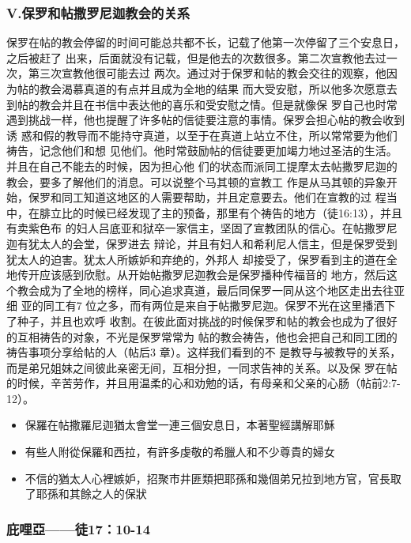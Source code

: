 \subsubsection{V.保罗和帖撒罗尼迦教会的关系}
保罗在帖的教会停留的时间可能总共都不长，记载了他第一次停留了三个安息日，之后被赶了
出来，后面就没有记载，但是他去的次数很多。第二次宣教他去过一次，第三次宣教他很可能去过
两次。通过对于保罗和帖的教会交往的观察，他因为帖的教会渴慕真道的有点并且成为全地的结果
而大受安慰，所以他多次愿意去到帖的教会并且在书信中表达他的喜乐和受安慰之情。但是就像保
罗自己也时常遇到挑战一样，他也提醒了许多帖的信徒要注意的事情。保罗会担心帖的教会收到诱
惑和假的教导而不能持守真道，以至于在真道上站立不住，所以常常要为他们祷告，记念他们和想
见他们。他时常鼓励帖的信徒要更加竭力地过圣洁的生活。并且在自己不能去的时候，因为担心他
们的状态而派同工提摩太去帖撒罗尼迦的教会，要多了解他们的消息。可以说整个马其顿的宣教工
作是从马其顿的异象开始，保罗和同工知道这地区的人需要帮助，并且定意要去。他们在宣教的过
程当中，在腓立比的时候已经发现了主的预备，那里有个祷告的地方（徒16:13），并且有卖紫色布
的妇人吕底亚和狱卒一家信主，坚固了宣教团队的信心。在帖撒罗尼迦有犹太人的会堂，保罗进去
辩论，并且有妇人和希利尼人信主，但是保罗受到犹太人的迫害。犹太人所嫉妒和弃绝的，外邦人
却接受了，保罗看到主的道在全地传开应该感到欣慰。从开始帖撒罗尼迦教会是保罗播种传福音的
地方，然后这个教会成为了全地的榜样，同心追求真道，最后同保罗一同从这个地区走出去往亚细
亚的同工有7 位之多，而有两位是来自于帖撒罗尼迦。保罗不光在这里播洒下了种子，并且也欢呼
收割。在彼此面对挑战的时候保罗和帖的教会也成为了很好的互相祷告的对象，不光是保罗常常为
帖的教会祷告，他也会把自己和同工团的祷告事项分享给帖的人（帖后3 章）。这样我们看到的不
是教导与被教导的关系，而是弟兄姐妹之间彼此亲密无间，互相分担，一同求告神的关系。以及保
罗在帖的时候，辛苦劳作，并且用温柔的心和劝勉的话，有母亲和父亲的心肠（帖前2:7-12）。

\begin{itemize}%
\itemsep-.25em 
\item 保羅在帖撒羅尼迦猶太會堂一連三個安息日，本著聖經講解耶穌
\item 有些人附從保羅和西拉，有許多虔敬的希臘人和不少尊貴的婦女
\item 不信的猶太人心裡嫉妒，招聚市井匪類把耶孫和幾個弟兄拉到地方官，官長取了耶孫和其餘之人的保狀
\end{itemize}



\subsubsection{庇哩亞——徒17：10-14}

